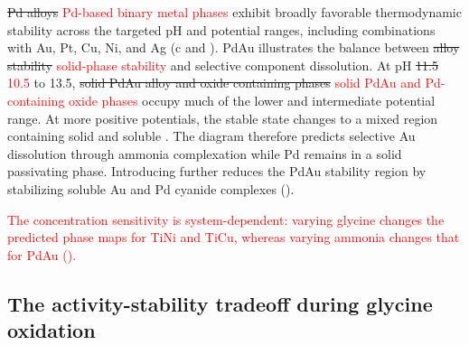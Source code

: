 \documentclass[twoside,twocolumn,9pt]{article}
\begin{document}
\sout{Pd alloys} \textcolor{red}{Pd-based binary metal phases} exhibit broadly favorable thermodynamic stability across the targeted pH and potential ranges, including combinations with Au, Pt, Cu, Ni, and Ag (c and ). PdAu illustrates the balance between \sout{alloy stability} \textcolor{red}{solid-phase stability} and selective component dissolution. At pH \sout{11.5} \textcolor{red}{10.5} to 13.5, \sout{solid PdAu alloy and oxide containing phases} \textcolor{red}{solid PdAu and Pd-containing oxide phases} occupy much of the lower and intermediate potential range. At more positive potentials, the stable state changes to a mixed region containing solid  and soluble . The diagram therefore predicts selective Au dissolution through ammonia complexation while Pd remains in a solid passivating phase. Introducing  further reduces the PdAu stability region by stabilizing soluble Au and Pd cyanide complexes ().



\textcolor{red}{The concentration sensitivity is system-dependent: varying glycine changes the predicted phase maps for TiNi and TiCu, whereas varying ammonia changes that for PdAu ().}

\subsection{The activity-stability tradeoff during glycine oxidation}
\end{document}
